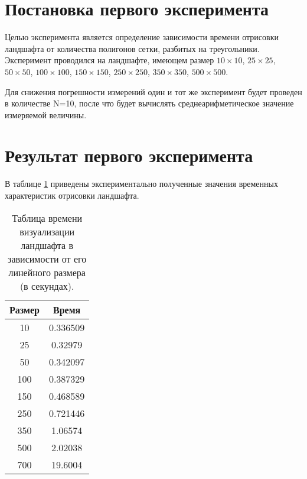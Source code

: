 \begin{figure}[H]
\end{figure}

\begin{figure}[H]
\end{figure}



\section{Постановка первого эксперимента}
Целью эксперимента является определение зависимости времени отрисовки ландшафта от количества полигонов сетки, разбитых на треугольники. Эксперимент проводился на ландшафте, имеющем размер $10\times10$, $25\times25$, $50\times50$, $100\times100$, $150\times150$, $250\times250$, $350\times350$, $500\times500$.

Для снижения погрешности измерений один и тот же эксперимент будет проведен в количестве N=10, после что будет вычислять среднеарифметическое значение измеряемой величины.


\section{Результат первого эксперимента}
В таблице \ref{table:draw_landscape} приведены экспериментально полученные значения временных характеристик отрисовки ландшафта.

\begin{table}[ht!]
	\centering
	\captionsetup{singlelinecheck = false, justification=raggedright}
	\caption{Таблица времени визуализации ландшафта в зависимости от его линейного размера (в секундах).}
	\label{table:draw_landscape}
	\begin{tabular}{|c|c|}
		\hline
		Размер & Время \\ \hline
		10 & 0.336509 \\ \hline
		25 & 0.32979 \\ \hline
		50 & 0.342097 \\ \hline
		100 & 0.387329 \\ \hline
		150 & 0.468589 \\ \hline
		250 & 0.721446 \\ \hline
		350 & 1.06574 \\\hline
		500 & 2.02038 \\\hline
		700 & 19.6004 \\\hline
	\end{tabular}
\end{table} 

